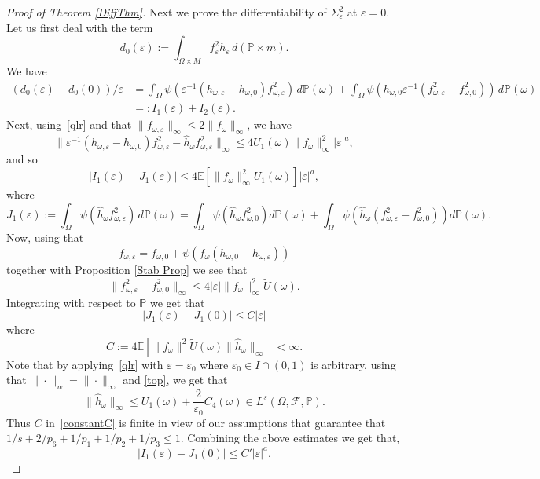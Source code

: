 \documentclass[11pt,reqno,a4paper]{article}
\theoremstyle{special}
\renewcommand{\epsilon}{\varepsilon}
\def\om{\omega}
\begin{document}
\begin{proof}[Proof of Theorem \ref{DiffThm}]
Next we prove the differentiability of $\Sigma_\varepsilon^2$ at $\varepsilon=0$.
Let us first deal with the  term  
$$
d_0(\varepsilon):=\int_{\Omega \times M} f_\varepsilon^2 h_{\varepsilon}\, d(\mathbb P\times m).
$$
We have 
\[
\begin{split}
(d_0(\varepsilon)-d_0(0))/\varepsilon &=
\int_\Omega\psi(\varepsilon^{-1}(h_{\om, \varepsilon}-h_{\om, 0})f_{\om, \varepsilon}^2)\, d\mathbb P(\om)+\int_\Omega \psi(h_{\om, 0}\varepsilon^{-1} (f_{\om, \varepsilon}^2-f_{\om, 0}^2))\, d\mathbb P(\om) \\
&=:I_1(\varepsilon)+I_2(\varepsilon).
\end{split}
\]
Next, using~\eqref{qlr} and that $\|f_{\om, \varepsilon}\|_\infty \le 2\|f_\om\|_\infty$, we have
$$
\|\varepsilon^{-1}(h_{\om, \varepsilon}-h_{\om, 0})f_{\om, \varepsilon}^2-\hat h_\om f_{\om, \varepsilon}^2\|_\infty\leq   4U_1(\omega)  \|f_\om\|_\infty^2 |\varepsilon|^a,
$$
and so 
$$
|I_1(\varepsilon)-J_1(\varepsilon)|\leq 4 \mathbb E[\|f_\om\|_\infty^2 U_1(\om)]|\varepsilon|^a,
$$
where 
$$
J_1(\varepsilon):=\int_\Omega \psi(\hat h_\om f^2_{\om, \varepsilon})\, d\mathbb P(\om)
=\int_\Omega \psi(\hat h_\om f^2_{\om, 0})d\mathbb P(\om)+\int_\Omega \psi(\hat h_\om (f^2_{\om, \varepsilon}-f^2_{\om, 0}))d\mathbb P(\om).
$$
Now, using that 
\begin{equation}\label{f diff}
f_{\om,\varepsilon}=f_{\om, 0}+\psi(f_\om(h_{\om, 0}-h_{\om,\varepsilon}))  \end{equation}
together with Proposition \ref{Stab Prop}  we see that
$$
\|f^2_{\om, \varepsilon}-f^2_{\om, 0}\|_\infty \leq 4|\varepsilon|\|f_\om\|_\infty^2\tilde U(\om).
$$
Integrating with respect to $\mathbb P$ we get that 
$$
|J_1(\varepsilon)-J_1(0)|\leq C|\varepsilon|
$$
where
\begin{equation}\label{constantC}
C:=4\mathbb E[\|f_\om\|^2\tilde U(\om)\|\hat h_\om\|_\infty]<\infty.
\end{equation}
Note that by applying~\eqref{qlr} with $\epsilon=\epsilon_0$ where $\epsilon_0 \in I\cap (0, 1)$ is arbitrary,  using that $\|\cdot\|_w=\|\cdot\|_{\infty}$ and \eqref{top}, we get that 
\begin{equation}\label{hat h bd}
\|\hat h_\om\|_\infty\leq  U_1(\om)+ \frac{2}{\epsilon_0}C_4(\om)\in L^{s}(\Omega,\mathcal F,\mathbb P). 
\end{equation}
Thus $C$ in~\eqref{constantC} is finite in view of our assumptions that guarantee that $1/s+2/p_6+1/p_1+1/p_2+1/p_3\leq 1$.
Combining the above estimates we get that,
$$
|I_1(\varepsilon)-J_1(0)|\leq C'|\varepsilon|^a.
$$


\end{proof}
\end{document}

